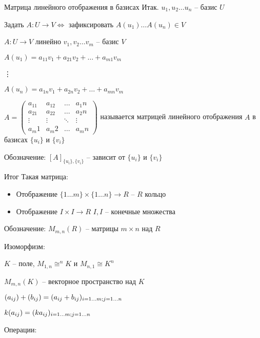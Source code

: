 \documentclass[12pt]{article}
\begin{document}
\begin{defin}{Матрица линейного отображения в базисах}
    Итак. $u_1, u_2 \ldots u_n$ -- базис $U$

    Задать $A : U \rightarrow V \Leftrightarrow$ зафиксировать $A(u_1) \ldots A(u_n) \in V$

    $A : U \rightarrow V$ линейно $v_1, v_2 \ldots v_m$ -- базис $V$

    $A(u_1) = a_{11}v_1 + a_{21}v_2 + \ldots + a_{m1}v_m$

    \vdots

    $A(u_n) = a_{1n}v_1 + a_{2n}v_2 + \ldots + a_{mn}v_m$

    $A = \begin{pmatrix}
        a_11 & a_12 & \ldots & a_1n \\
        a_21 & a_22 & \ldots & a_2n \\
        \vdots & \vdots & \ddots & \vdots \\
        a_m1 & a_m2 & \ldots & a_mn
    \end{pmatrix}$ называется матрицей линейного отображения $A$ в базисах $\{u_i\}$ и $\{v_i\}$

    Обозначение: $[A]_{\{u_i\}, \{v_i\}}$ -- зависит от $\{u_i\}$ и $\{v_i\}$
\end{defin}

\begin{nota}{Итог}
    Такая матрица:

    \begin{itemize}
        \item Отображение $\{1 \ldots m\} \times \{1 \ldots n\} \rightarrow R$ -- $R$ кольцо
        \item Отображение $I \times I \rightarrow R$ $I, I$ -- конечные множества
    \end{itemize}

    Обозначение: $M_{m, n}(R)$ -- матрицы $m \times n$ над $R$
\end{nota}

Изоморфизм:

$K$ -- поле, $M_{1, n} \cong ^nK$ и $M_{n, 1} \cong K^n$

$M_{m, n}(K)$ -- векторное пространство над $K$

$(a_{ij}) + (b_{ij}) = (a_{ij} + b_{ij})_{i = 1 \ldots m; \\ j = 1 \ldots n}$

$k(a_{ij}) = (ka_{ij})_{i = 1 \ldots m; \\ j = 1 \ldots n}$

Операции:
\end{document}
